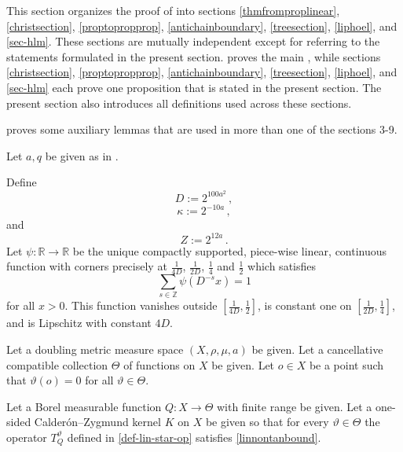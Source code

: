 \documentclass[10pt,a4paper]{article}
\theoremstyle{plain}
\theoremstyle{definition}
\numberwithin{equation}{subsection}
\newcommand{\R}{{\mathbb{R}}}
\newcommand{\tQ}{{Q}}
\newcommand{\mfa}{{\vartheta}}
\newcommand{\Mf}{{\Theta}}
\begin{document}
This section organizes the proof of  into sections \ref{thmfromproplinear}, \ref{christsection}, \ref{proptopropprop}, \ref{antichainboundary}, \ref{treesection}, \ref{liphoel}, and \ref{sec-hlm}. These sections are mutually independent except for referring to the statements formulated in the present section.  proves the main , while sections \ref{christsection}, \ref{proptopropprop}, \ref{antichainboundary}, \ref{treesection}, \ref{liphoel}, and \ref{sec-hlm} each prove one proposition that is stated in the present section. The present section also introduces all definitions used across these sections.

 proves some auxiliary lemmas that are used in more than one of the sections 3-9.

Let $a, q$ be given as in .




Define
\begin{equation}\label{defineD}
    D:= 2^{100 a^2}\, ,
\end{equation}
\begin{equation}\label{definekappa}
    \kappa:= 2^{-10a}\,,
\end{equation}
and
\begin{equation}
    \label{defineZ}
    Z := 2^{12a}\,.
\end{equation}
Let
 $\psi:\R \to \R$ be the unique compactly supported, piece-wise linear, continuous function with corners precisely at $\frac 1{4D}$, $\frac 1{2D}$, $\frac 14$ and $\frac 12$ which satisfies
 \begin{equation}
    \label{eq-psisum}
    \sum_{s\in \mathbb{Z}} \psi(D^{-s}x)=1
\end{equation}
for all $x>0$. This function vanishes outside $[\frac1{4D},\frac 12]$, is constant one on
$[\frac1{2D},\frac 14]$, and is Lipschitz
with constant $4D$.




Let a doubling metric measure space $(X,\rho,\mu, a)$ be given.
Let a cancellative compatible collection $\Mf$ of functions on $X$ be given.
Let $o\in X$ be a point such that $\mfa(o)=0$
for all $\mfa\in \Mf$.


Let a Borel measurable function $\tQ:X\to \Mf$ with finite range be given.
Let a one-sided Calder\'on--Zygmund kernel $K$ on $X$ be given so that for every $\mfa\in \Mf$ the operator $T_{\tQ}^{\mfa}$ defined in \eqref{def-lin-star-op}
satisfies \eqref{linnontanbound}.
\end{document}
